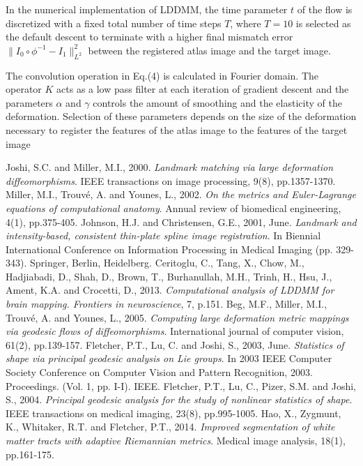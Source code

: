 \documentclass{article}
\theoremstyle{definition}
\theoremstyle{plain}
\begin{document}
In the numerical implementation of LDDMM, the time parameter $t$ of the flow is discretized with a fixed total number of time steps $T$, where $T=10$ is selected as the default descent to terminate with a higher final mismatch error $\|I_0\circ\phi^{-1}-I_1\|^2_{L^2}$ between the registered atlas image and the target image. 

The convolution operation in Eq.(4) is calculated in Fourier domain. The operator $K$ acts as a low pass filter at each iteration of gradient descent and the parameters $\alpha$ and $\gamma$ controls the amount of smoothing and the elasticity of the deformation. Selection of these parameters depends on the size of the deformation necessary to register the features of the atlas image to the features of the target image

\begin{thebibliography}{99} 
Joshi, S.C. and Miller, M.I., 2000. \textit{Landmark matching via large deformation diffeomorphisms}. IEEE transactions on image processing, 9(8), pp.1357-1370.
Miller, M.I., Trouvé, A. and Younes, L., 2002. \textit{On the metrics and Euler-Lagrange equations of computational anatomy}. Annual review of biomedical engineering, 4(1), pp.375-405.
Johnson, H.J. and Christensen, G.E., 2001, June. \textit{Landmark and intensity-based, consistent thin-plate spline image registration}. In Biennial International Conference on Information Processing in Medical Imaging (pp. 329-343). Springer, Berlin, Heidelberg.
Ceritoglu, C., Tang, X., Chow, M., Hadjiabadi, D., Shah, D., Brown, T., Burhanullah, M.H., Trinh, H., Hsu, J., Ament, K.A. and Crocetti, D., 2013. \textit{Computational analysis of LDDMM for brain mapping. Frontiers in neuroscience}, 7, p.151.
Beg, M.F., Miller, M.I., Trouvé, A. and Younes, L., 2005. \textit{Computing large deformation metric mappings via geodesic flows of diffeomorphisms}. International journal of computer vision, 61(2), pp.139-157.
Fletcher, P.T., Lu, C. and Joshi, S., 2003, June. \textit{Statistics of shape via principal geodesic analysis on Lie groups}. In 2003 IEEE Computer Society Conference on Computer Vision and Pattern Recognition, 2003. Proceedings. (Vol. 1, pp. I-I). IEEE.
Fletcher, P.T., Lu, C., Pizer, S.M. and Joshi, S., 2004. \textit{Principal geodesic analysis for the study of nonlinear statistics of shape}. IEEE transactions on medical imaging, 23(8), pp.995-1005.
Hao, X., Zygmunt, K., Whitaker, R.T. and Fletcher, P.T., 2014. \textit{Improved segmentation of white matter tracts with adaptive Riemannian metrics}. Medical image analysis, 18(1), pp.161-175.

\end{thebibliography}
\end{document}
